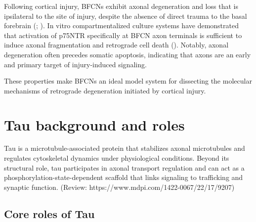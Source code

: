 \documentclass[
  letterpaper,
  DIV=11,
  numbers=noendperiod]{scrreprt}
\begin{document}
Following cortical injury, BFCNs exhibit axonal degeneration and loss
that is ipsilateral to the site of injury, despite the absence of direct
trauma to the basal forebrain (;
). In vitro compartmentalized culture systems have demonstrated
that activation of p75NTR specifically at BFCN axon terminals is
sufficient to induce axonal fragmentation and retrograde cell death
(). Notably, axonal degeneration often precedes somatic apoptosis,
indicating that axons are an early and primary target of injury-induced
signaling.

These properties make BFCNs an ideal model system for dissecting the
molecular mechanisms of retrograde degeneration initiated by cortical
injury.

\section{Tau background and roles}\label{tau-background-and-roles}

Tau is a microtubule-associated protein that stabilizes axonal
microtubules and regulates cytoskeletal dynamics under physiological
conditions. Beyond its structural role, tau participates in axonal
transport regulation and can act as a phosphorylation-state-dependent
scaffold that links signaling to trafficking and synaptic function.
(Review: https://www.mdpi.com/1422-0067/22/17/9207)

\subsection{Core roles of Tau}\label{core-roles-of-tau}
\end{document}
